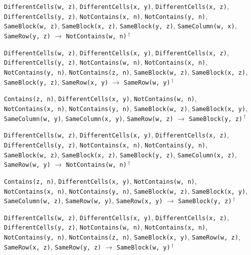 \documentclass[11pt,a4paper]{article}
\theoremstyle{definition}
\theoremstyle{remark}
\begin{document}
{\begin{enumerate}[label={[\arabic*]},leftmargin=2.6em,itemsep=1pt]
  \item \texttt{DifferentCells(w,~z)}, \allowbreak \texttt{DifferentCells(x,~y)}, \allowbreak \texttt{DifferentCells(x,~z)}, \allowbreak \texttt{DifferentCells(y,~z)}, \allowbreak \texttt{NotContains(x,~n)}, \allowbreak \texttt{NotContains(y,~n)}, \allowbreak \texttt{SameBlock(w,~z)}, \allowbreak \texttt{SameBlock(x,~z)}, \allowbreak \texttt{SameBlock(y,~z)}, \allowbreak \texttt{SameColumn(w,~x)}, \allowbreak \texttt{SameRow(y,~z)} \;$\to$\; \texttt{NotContains(w,~n)}\,$^{\dagger}$
  \item \texttt{DifferentCells(w,~z)}, \allowbreak \texttt{DifferentCells(x,~y)}, \allowbreak \texttt{DifferentCells(x,~z)}, \allowbreak \texttt{DifferentCells(y,~z)}, \allowbreak \texttt{NotContains(w,~n)}, \allowbreak \texttt{NotContains(x,~n)}, \allowbreak \texttt{NotContains(y,~n)}, \allowbreak \texttt{NotContains(z,~n)}, \allowbreak \texttt{SameBlock(w,~z)}, \allowbreak \texttt{SameBlock(x,~z)}, \allowbreak \texttt{SameBlock(y,~z)}, \allowbreak \texttt{SameRow(x,~y)} \;$\to$\; \texttt{SameRow(w,~y)}\,$^{\dagger}$
  \item \texttt{Contains(z,~n)}, \allowbreak \texttt{DifferentCells(x,~y)}, \allowbreak \texttt{NotContains(w,~n)}, \allowbreak \texttt{NotContains(x,~n)}, \allowbreak \texttt{NotContains(y,~n)}, \allowbreak \texttt{SameBlock(w,~z)}, \allowbreak \texttt{SameBlock(x,~y)}, \allowbreak \texttt{SameColumn(w,~y)}, \allowbreak \texttt{SameColumn(x,~y)}, \allowbreak \texttt{SameRow(w,~z)} \;$\to$\; \texttt{SameBlock(y,~z)}\,$^{\dagger}$
  \item \texttt{DifferentCells(w,~z)}, \allowbreak \texttt{DifferentCells(x,~y)}, \allowbreak \texttt{DifferentCells(x,~z)}, \allowbreak \texttt{DifferentCells(y,~z)}, \allowbreak \texttt{NotContains(x,~n)}, \allowbreak \texttt{NotContains(y,~n)}, \allowbreak \texttt{SameBlock(w,~z)}, \allowbreak \texttt{SameBlock(x,~z)}, \allowbreak \texttt{SameBlock(y,~z)}, \allowbreak \texttt{SameColumn(x,~z)}, \allowbreak \texttt{SameRow(w,~y)} \;$\to$\; \texttt{NotContains(w,~n)}\,$^{\dagger}$
  \item \texttt{Contains(z,~n)}, \allowbreak \texttt{DifferentCells(x,~y)}, \allowbreak \texttt{NotContains(w,~n)}, \allowbreak \texttt{NotContains(x,~n)}, \allowbreak \texttt{NotContains(y,~n)}, \allowbreak \texttt{SameBlock(w,~z)}, \allowbreak \texttt{SameBlock(x,~y)}, \allowbreak \texttt{SameColumn(w,~z)}, \allowbreak \texttt{SameRow(w,~y)}, \allowbreak \texttt{SameRow(x,~y)} \;$\to$\; \texttt{SameBlock(y,~z)}\,$^{\dagger}$
  \item \texttt{DifferentCells(w,~z)}, \allowbreak \texttt{DifferentCells(x,~y)}, \allowbreak \texttt{DifferentCells(x,~z)}, \allowbreak \texttt{DifferentCells(y,~z)}, \allowbreak \texttt{NotContains(w,~n)}, \allowbreak \texttt{NotContains(x,~n)}, \allowbreak \texttt{NotContains(y,~n)}, \allowbreak \texttt{NotContains(z,~n)}, \allowbreak \texttt{SameBlock(x,~y)}, \allowbreak \texttt{SameRow(w,~z)}, \allowbreak \texttt{SameRow(x,~z)}, \allowbreak \texttt{SameRow(y,~z)} \;$\to$\; \texttt{SameBlock(w,~y)}\,$^{\dagger}$

\end{enumerate}}
\end{document}

